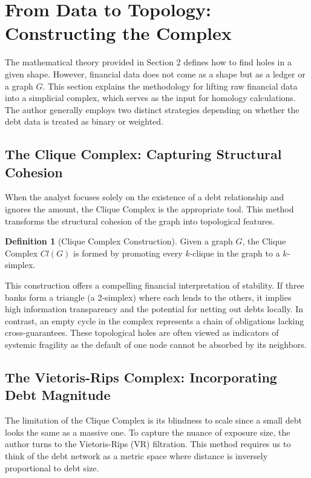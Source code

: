 \documentclass[12pt,reqno]{amsart}
\theoremstyle{definition}
\newtheorem{definition}[theorem]{Definition}
\numberwithin{equation}{section}
\begin{document}
   \section{From Data to Topology: Constructing the Complex}\label{sec:data_to_top}

   The mathematical theory provided in Section 2 defines how to find holes in a given shape. However, financial data does not come as a shape but as a ledger or a graph $G$. This section explains the methodology for lifting raw financial data into a simplicial complex, which serves as the input for homology calculations. The author generally employs two distinct strategies depending on whether the debt data is treated as binary or weighted.

   \subsection{The Clique Complex: Capturing Structural Cohesion}
   When the analyst focuses solely on the existence of a debt relationship and ignores the amount, the Clique Complex is the appropriate tool. This method transforms the structural cohesion of the graph into topological features.

   \begin{definition}[Clique Complex Construction]
   Given a graph $G$, the Clique Complex $Cl(G)$ is formed by promoting every $k$-clique in the graph to a $k$-simplex. 
   \end{definition}

   This construction offers a compelling financial interpretation of stability. If three banks form a triangle (a 2-simplex) where each lends to the others, it implies high information transparency and the potential for netting out debts locally. In contrast, an empty cycle in the complex represents a chain of obligations lacking cross-guarantees. These topological holes are often viewed as indicators of systemic fragility as the default of one node cannot be absorbed by its neighbors.

   \subsection{The Vietoris-Rips Complex: Incorporating Debt Magnitude}\label{VR_complex}
   The limitation of the Clique Complex is its blindness to scale since a small debt looks the same as a massive one. To capture the nuance of exposure size, the author turns to the Vietoris-Rips (VR) filtration. This method requires us to think of the debt network as a metric space where distance is inversely proportional to debt size.
\end{document}

